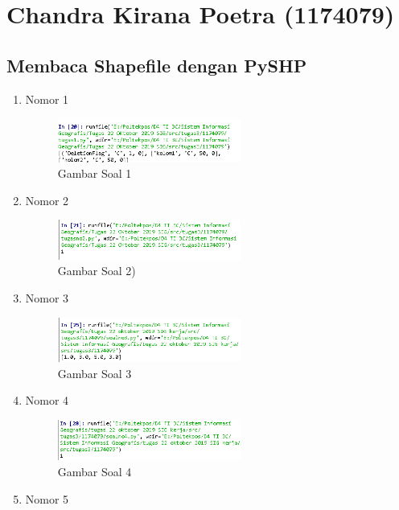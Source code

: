 \section{Chandra Kirana Poetra (1174079)}
\subsection{Membaca Shapefile dengan PySHP}
\begin{enumerate}
	\item Nomor 1
	
	\begin{figure}[H]
		\includegraphics[width=6cm]{figures/Tugas3/1174079/soal1.png}
		\centering
		\caption{Gambar Soal 1}
	\end{figure}
	\item Nomor 2
	
	\begin{figure}[H]
		\includegraphics[width=6cm]{figures/Tugas3/1174079/soal2.png}
		\centering
		\caption{Gambar Soal 2)}
	\end{figure}
	\item Nomor 3
	
	\begin{figure}[H]
		\includegraphics[width=6cm]{figures/Tugas3/1174079/soal3.png}
		\centering
		\caption{Gambar Soal 3}
	\end{figure}
	\item Nomor 4
	
	\begin{figure}[H]
		\includegraphics[width=6cm]{figures/Tugas3/1174079/soal4.png}
		\centering
		\caption{Gambar Soal 4}
	\end{figure}
	\item Nomor 5
	

\end{enumerate}

